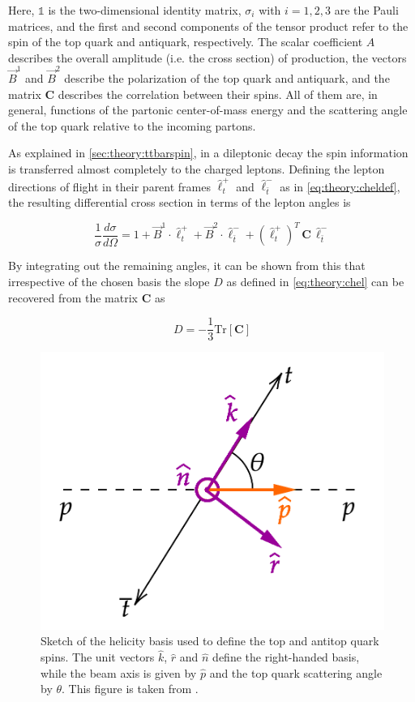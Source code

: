 Here, $\mathbb{1}$ is the two-dimensional identity matrix, $\sigma_i$ with $i=1,2,3$ are the Pauli matrices, and the first and second components of the tensor product refer to the spin of the top quark and antiquark, respectively. The scalar coefficient $A$ describes the overall amplitude (i.e. the cross section) of \ttbar production, the vectors $\vec{B}^1$ and $\vec{B}^2$ describe the polarization of the top quark and antiquark, and the matrix $\mathbf{C}$ describes the correlation between their spins. All of them are, in general, functions of the partonic center-of-mass energy and the scattering angle of the top quark relative to the incoming partons.

As explained in \cref{sec:theory:ttbarspin}, in a dileptonic decay the spin information is transferred almost completely to the charged leptons. Defining the lepton directions of flight in their parent frames $\hat{\ell}_t^+$ and $\hat{\ell}_{\bar{t}}^-$ as in \cref{eq:theory:cheldef}, the resulting differential cross section in terms of the lepton angles is~\cite{Anuar:PhD}

\begin{equation}
    \frac{1}{\sigma} \frac{d \sigma}{d \Omega} = 1 + \vec{B}^1 \cdot \hat{\ell}_t^+ + \vec{B}^2 \cdot \hat{\ell}_{\bar{t}}^- + (\hat{\ell}_t^+)^T \, \mathbf{C} \, \hat{\ell}_{\bar{t}}^-
\end{equation}

By integrating out the remaining angles, it can be shown from this that irrespective of the chosen basis the slope $D$ as defined in \cref{eq:theory:chel} can be recovered from the matrix $\mathbf{C}$ as~\cite{Bernreuther:2004jv,Bernreuther:2017yhg}

\begin{equation}
    D = - \frac{1}{3} \mathrm{Tr} \left[ \mathbf{C} \right]
\end{equation}

\begin{figure}[t]
  \centering
  \includegraphics[width=0.5\linewidth]{figures/helicity_basis.png}
  \caption{Sketch of the helicity basis used to define the top and antitop quark spins. The unit vectors $\hat{k}$, $\hat{r}$ and $\hat{n}$ define the right-handed basis, while the beam axis is given by $\hat{p}$ and the top quark scattering angle by $\theta$. This figure is taken from .}
  \label{fig:theory:helicitybasis}
\end{figure}

